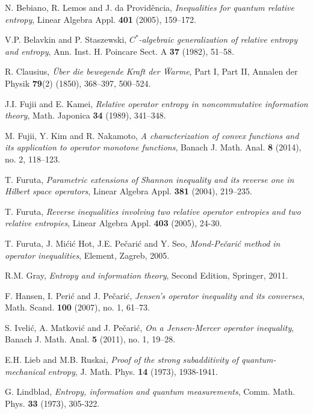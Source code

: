 \documentclass[12pt, reqno]{amsart}
\theoremstyle{definition}
\theoremstyle{remark}
\numberwithin{equation}{section}
\begin{document}
\begin{thebibliography}{99}

 N. Bebiano, R. Lemos and J. da Provid\^{e}ncia, \textit{Inequalities for quantum relative entropy}, Linear Algebra Appl. \textbf{401} (2005), 159--172.

 V.P. Belavkin and P. Staszewski, \textit{$C^*$-algebraic generalization of relative entropy and entropy}, Ann. Inst. H. Poincare Sect. A \textbf{37} (1982), 51--58.

 R. Clausius, \textit{\"Uber die bewegende Kraft der \"Warme}, Part I, Part II, Annalen der Physik \textbf{79}(2) (1850), 368--397, 500--524.

 J.I. Fujii and E. Kamei, \textit{Relative operator entropy in noncommutative information theory}, Math. Japonica \textbf{34} (1989), 341--348.

 M. Fujii, Y. Kim and R. Nakamoto, \textit{A characterization of convex functions and its application to operator monotone functions}, Banach J. Math. Anal. \textbf{8} (2014), no. 2, 118--123.

 T. Furuta, \textit{Parametric extensions of Shannon inequality and its reverse one in Hilbert space operators}, Linear Algebra Appl. \textbf{381} (2004), 219--235.

 T. Furuta, \textit{Reverse inequalities involving two relative operator entropies and two relative entropies}, Linear Algebra Appl. \textbf{403} (2005), 24-30.

 T. Furuta, J. Mi\'{c}i\'{c} Hot, J.E. Pe\v{c}ari\'{c} and Y. Seo, \textit{Mond-Pe\v{c}ari\'{c} method in operator inequalities}, Element, Zagreb, 2005.

 R.M. Gray, \textit{Entropy and information theory}, Second Edition, Springer, 2011.

 F. Hansen, I. Peri\'{c} and J. Pe\v{c}ari\'{c}, \textit{Jensen's operator inequality and its converses}, Math. Scand. \textbf{100} (2007), no. 1, 61--73.

 S. Iveli\'c, A. Matkovi\'c and  J. Pe\v{c}ari\'{c}, \textit{On a Jensen-Mercer operator inequality}, Banach J. Math. Anal. \textbf{5} (2011), no. 1, 19--28.

 E.H. Lieb and M.B. Ruskai, \textit{Proof of the strong subadditivity of quantum-mechanical entropy}, J. Math. Phys. \textbf{14} (1973), 1938-1941.

 G. Lindblad,  \textit{Entropy, information and quantum measurements}, Comm. Math. Phys. \textbf{33} (1973), 305-322.


\end{thebibliography}
\end{document}
